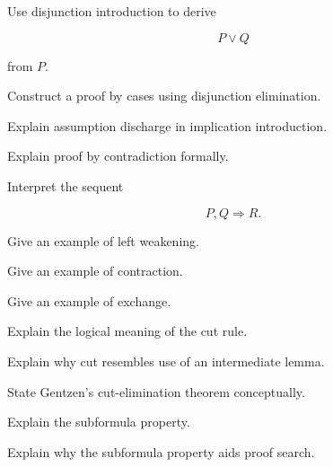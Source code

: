 \begin{exercise}[2]
Use disjunction introduction to derive

\[
P\lor Q
\]

from \(P\).
\end{exercise}

\begin{exercise}[3]
Construct a proof by cases using disjunction elimination.
\end{exercise}

\begin{exercise}[3]
Explain assumption discharge in implication introduction.
\end{exercise}

\begin{exercise}[3]
Explain proof by contradiction formally.
\end{exercise}

\begin{exercise}[2]
Interpret the sequent

\[
P,Q\Rightarrow R.
\]
\end{exercise}

\begin{exercise}[2]
Give an example of left weakening.
\end{exercise}

\begin{exercise}[2]
Give an example of contraction.
\end{exercise}

\begin{exercise}[2]
Give an example of exchange.
\end{exercise}

\begin{exercise}[3]
Explain the logical meaning of the cut rule.
\end{exercise}

\begin{exercise}[3]
Explain why cut resembles use of an intermediate lemma.
\end{exercise}

\begin{exercise}[3]
State Gentzen's cut-elimination theorem conceptually.
\end{exercise}

\begin{exercise}[3]
Explain the subformula property.
\end{exercise}

\begin{exercise}[3]
Explain why the subformula property aids proof search.
\end{exercise}

